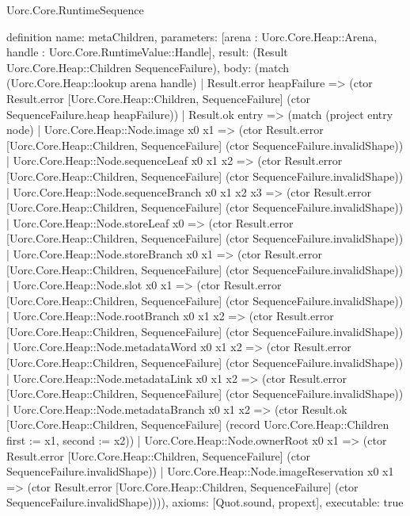\begin{lexlean}{Uorc.Core.RuntimeSequence}
\begin{semanticmodule}
definition{
  name: metaChildren,
  parameters: [arena : Uorc.Core.Heap::Arena, handle : Uorc.Core.RuntimeValue::Handle],
  result: (Result Uorc.Core.Heap::Children SequenceFailure),
  body: (match (Uorc.Core.Heap::lookup arena handle)
    | Result.error heapFailure => (ctor Result.error [Uorc.Core.Heap::Children, SequenceFailure] (ctor SequenceFailure.heap heapFailure))
    | Result.ok entry => (match (project entry node)
      | Uorc.Core.Heap::Node.image x0 x1 => (ctor Result.error [Uorc.Core.Heap::Children, SequenceFailure] (ctor SequenceFailure.invalidShape))
      | Uorc.Core.Heap::Node.sequenceLeaf x0 x1 x2 => (ctor Result.error [Uorc.Core.Heap::Children, SequenceFailure] (ctor SequenceFailure.invalidShape))
      | Uorc.Core.Heap::Node.sequenceBranch x0 x1 x2 x3 => (ctor Result.error [Uorc.Core.Heap::Children, SequenceFailure] (ctor SequenceFailure.invalidShape))
      | Uorc.Core.Heap::Node.storeLeaf x0 => (ctor Result.error [Uorc.Core.Heap::Children, SequenceFailure] (ctor SequenceFailure.invalidShape))
      | Uorc.Core.Heap::Node.storeBranch x0 x1 => (ctor Result.error [Uorc.Core.Heap::Children, SequenceFailure] (ctor SequenceFailure.invalidShape))
      | Uorc.Core.Heap::Node.slot x0 x1 => (ctor Result.error [Uorc.Core.Heap::Children, SequenceFailure] (ctor SequenceFailure.invalidShape))
      | Uorc.Core.Heap::Node.rootBranch x0 x1 x2 => (ctor Result.error [Uorc.Core.Heap::Children, SequenceFailure] (ctor SequenceFailure.invalidShape))
      | Uorc.Core.Heap::Node.metadataWord x0 x1 x2 => (ctor Result.error [Uorc.Core.Heap::Children, SequenceFailure] (ctor SequenceFailure.invalidShape))
      | Uorc.Core.Heap::Node.metadataLink x0 x1 x2 => (ctor Result.error [Uorc.Core.Heap::Children, SequenceFailure] (ctor SequenceFailure.invalidShape))
      | Uorc.Core.Heap::Node.metadataBranch x0 x1 x2 => (ctor Result.ok [Uorc.Core.Heap::Children, SequenceFailure] (record Uorc.Core.Heap::Children {first := x1, second := x2}))
      | Uorc.Core.Heap::Node.ownerRoot x0 x1 => (ctor Result.error [Uorc.Core.Heap::Children, SequenceFailure] (ctor SequenceFailure.invalidShape))
      | Uorc.Core.Heap::Node.imageReservation x0 x1 => (ctor Result.error [Uorc.Core.Heap::Children, SequenceFailure] (ctor SequenceFailure.invalidShape)))),
  axioms: [Quot.sound, propext],
  executable: true
}


\end{semanticmodule}
\end{lexlean}
